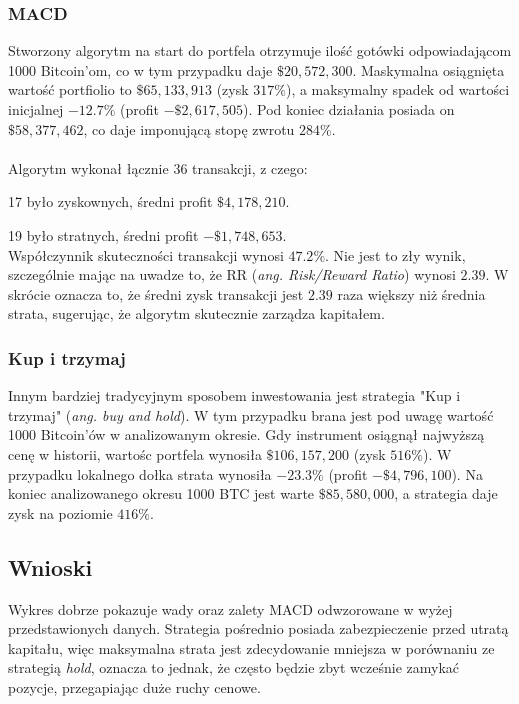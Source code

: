 \documentclass[11pt]{article}
\begin{document}
    \subsubsection{MACD}
    Stworzony algorytm na start do portfela otrzymuje ilość gotówki odpowiadającom 1000 Bitcoin'om, co w tym przypadku daje $\$20,572,300$.
    Maskymalna osiągnięta wartość portfiolio to $\$65,133,913$ (zysk $317\%$), a maksymalny spadek od wartości inicjalnej $-12.7\%$ (profit $-\$2,617,505$).
    Pod koniec działania posiada on $\$58,377,462$, co daje imponującą stopę zwrotu $284\%$.\\
    \\
    Algorytm wykonał łącznie 36 transakcji, z czego:
    
    17 było zyskownych, średni profit $\$4,178,210$.
    
    19 było stratnych, średni profit  $-\$1,748,653$.
    \\
    
    Współczynnik skuteczności transakcji wynosi $47.2\%$.
    Nie jest to zły wynik, szczególnie mając na uwadze to, że RR (\textit{ang. Risk/Reward Ratio}) wynosi $2.39$.
    W skrócie oznacza to, że średni zysk transakcji jest $2.39$ raza większy niż średnia strata, sugerując, że algorytm skutecznie zarządza kapitałem.
    \subsubsection{Kup i trzymaj}
    Innym bardziej tradycyjnym sposobem inwestowania jest strategia "Kup i trzymaj" (\textit{ang. buy and hold})\cite{wiki:hold}.
    W tym przypadku brana jest pod uwagę wartość 1000 Bitcoin'ów w analizowanym okresie.
    Gdy instrument osiągnął najwyższą cenę w historii, wartośc portfela wynosiła $\$106,157,200$ (zysk $516\%$).
    W przypadku lokalnego dołka strata wynosiła $-23.3\%$ (profit $-\$4,796,100$).
    Na koniec analizowanego okresu 1000 BTC jest warte $\$85,580,000$, a strategia daje zysk na poziomie $416\%$.

    \subsection{Wnioski}
    Wykres dobrze pokazuje wady oraz zalety MACD odwzorowane w wyżej przedstawionych danych.
    Strategia pośrednio posiada zabezpieczenie przed utratą kapitału, więc maksymalna strata jest zdecydowanie mniejsza w porównaniu ze strategią \textit{hold}, oznacza to jednak, że często będzie zbyt wcześnie zamykać pozycje, przegapiając duże ruchy cenowe. 
    
\end{document}
